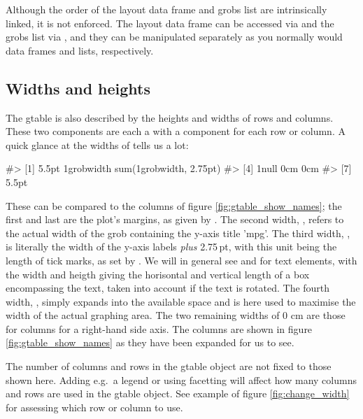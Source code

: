 Although the order of the layout data frame and grobs list are
intrinsically linked, it is not enforced. The layout data frame can be
accessed via  and the grobs list via ,
and they can be manipulated separately as you normally would data frames
and lists, respectively.

\subsection{Widths and heights}

The gtable is also described by the heights and widths of rows and
columns. These two components are each a  with a
component for each row or column. A quick glance at the widths of
 tells us a lot:


\begin{Soutput}
#> [1] 5.5pt                   1grobwidth              sum(1grobwidth, 2.75pt)
#> [4] 1null                   0cm                     0cm                    
#> [7] 5.5pt
\end{Soutput}


These can be compared to the columns of figure \ref{fig:gtable_show_names};
the first and last are the plot's margins, as given by .
The second width, , refers to the actual width of the grob
containing the y-axis title 'mpg'.
The third width, , 
is literally the width of the y-axis labels \emph{plus}
2.75\,pt, with this unit being the length of tick marks, as set by .
We will in general see  and  for text elements,
with the width and heigth giving the horisontal and vertical length of a box 
encompassing the text, taken into account if the text is rotated.
The fourth width, , simply expands into the available space and is here 
used to maximise the width of the actual graphing area.
The two remaining widths of 0 cm are those for columns for a right-hand side axis.
The columns are shown in figure \ref{fig:gtable_show_names} as they have been
expanded for us to see.

The number of columns and rows in the gtable object are not fixed to those shown here.
Adding e.g.\ a legend or using facetting will affect how many columns and rows are 
used in the gtable object. See example of figure \ref{fig:change_width} for 
assessing which row or column to use.


